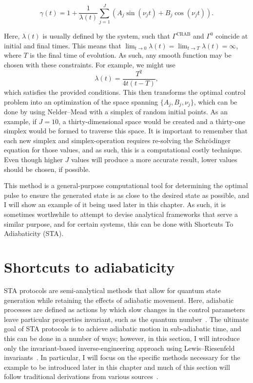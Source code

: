\begin{equation}
\gamma(t)=1+\frac{1}{\lambda(t)}\sum_{j=1}^J(A_j \sin(\nu_jt) + B_j\cos(\nu_jt)).
\end{equation}

\noindent Here, $\lambda(t)$ is usually defined by the system, such that $\Gamma^{\text{CRAB}}$ and $\Gamma^0$ coincide at initial and final times.
This means that $\lim_{t\rightarrow 0} \lambda(t) = \lim_{t\rightarrow T}\lambda(t) = \infty$, where $T$ is the final time of evolution.
As such, any smooth function may be chosen with these constraints.
For example, we might use
\begin{equation}
\lambda(t) = \frac{T^2}{4t(t-T)},
\end{equation}
\noindent which satisfies the provided conditions.
This then transforms the optimal control problem into an optimization of the space spanning $\{A_j, B_j, \nu_j\}$, which can be done by using Nelder--Mead with a simplex of random initial points.
As an example, if $J = 10$, a thirty-dimensional space would be created and a thirty-one simplex would be formed to traverse this space.
It is important to remember that each new simplex and simplex-operation requires re-solving the Schr\"odinger equation for those values, and as such, this is a computational costly technique.
Even though higher $J$ values will produce a more accurate result, lower values should be chosen, if possible.

This method is a general-purpose computational tool for determining the optimal pulse to ensure the generated state is as close to the desired state as possible, and I will show an example of it being used later in this chapter.
As such, it is sometimes worthwhile to attempt to devise analytical frameworks that serve a similar purpose, and for certain systems, this can be done with Shortcuts To Adiabaticity (STA).

\section{Shortcuts to adiabaticity}

STA protocols are semi-analytical methods that allow for quantum state generation while retaining the effects of adiabatic movement.
Here, adiabatic processes are defined as actions by which slow changes in the control parameters leave particular properties invariant, such as the quantum number~\cite{guery2019}.
The ultimate goal of STA protocols is to achieve adiabatic motion in sub-adiabatic time, and this can be done in a number of ways; however, in this section, I will introduce only the invariant-based inverse-engineering approach using Lewis--Riesenfeld invariants~\cite{torrontegui2013}.
In particular, I will focus on the specific methods necessary for the example to be introduced later in this chapter and much of this section will follow traditional derivations from various sources~\cite{torrontegui2013,guery2019, schloss2016}.

